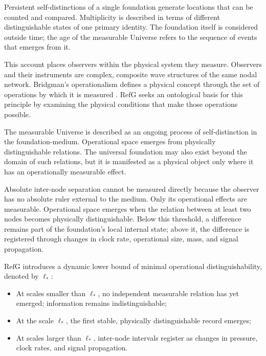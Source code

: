 \documentclass[11pt,a4paper]{article}
\newcommand{\RefG}{\mathrm{RefG}}
\begin{document}
Persistent self-distinctions of a single foundation generate locations that can be counted and compared. Multiplicity is described in terms of different distinguishable states of one primary identity. The foundation itself is considered outside time; the age of the measurable Universe refers to the sequence of events that emerges from it.

This account places observers within the physical system they measure. Observers and their instruments are complex, composite wave structures of the same nodal network. Bridgman's operationalism defines a physical concept through the set of operations by which it is measured \citep{bridgman1927}. $\RefG$ seeks an ontological basis for this principle by examining the physical conditions that make those operations possible.

The measurable Universe is described as an ongoing process of self-distinction in the foundation-medium. Operational space emerges from physically distinguishable relations. The universal foundation may also exist beyond the domain of such relations, but it is manifested as a physical object only where it has an operationally measurable effect.

Absolute inter-node separation cannot be measured directly because the observer has no absolute ruler external to the medium. Only its operational effects are measurable. Operational space emerges when the relation between at least two nodes becomes physically distinguishable. Below this threshold, a difference remains part of the foundation's local internal state; above it, the difference is registered through changes in clock rate, operational size, mass, and signal propagation.

$\RefG$ introduces a dynamic lower bound of minimal operational distinguishability, denoted by $\ell_*$:
\begin{itemize}
\item At scales smaller than $\ell_*$, no independent measurable relation has yet emerged; information remains indistinguishable;
\item At the scale $\ell_*$, the first stable, physically distinguishable record emerges;
\item At scales larger than $\ell_*$, inter-node intervals register as changes in pressure, clock rates, and signal propagation.
\end{itemize}
\end{document}

